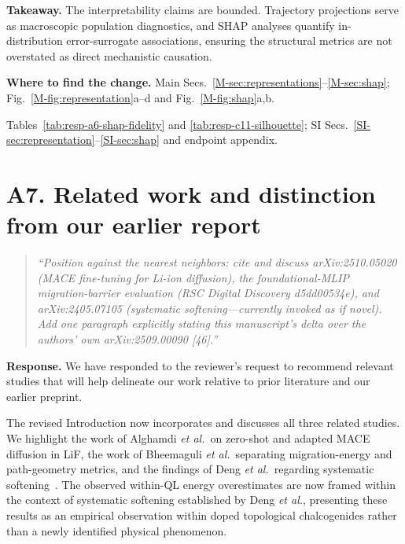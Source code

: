 \documentclass[11pt]{article}
\newcommand{\location}[2]{\par{\small\textbf{Where to find the change.} #1\par #2}\par}
\begin{document}
\textbf{Takeaway.} The interpretability claims are bounded. Trajectory projections serve as macroscopic population diagnostics, and SHAP analyses quantify in-distribution error-surrogate associations, ensuring the structural metrics are not overstated as direct mechanistic causation.
\location{Main Secs.~\ref{M-sec:representations}--\ref{M-sec:shap}; Fig.~\ref{M-fig:representation}a--d and Fig.~\ref{M-fig:shap}a,b.}{Tables~\ref{tab:resp-a6-shap-fidelity} and \ref{tab:resp-c11-silhouette}; SI Secs.~\ref{SI-sec:representation}--\ref{SI-sec:shap} and endpoint appendix.}

\section*{A7. Related work and distinction from our earlier report}

\begin{quote}\small \itshape
``Position against the nearest neighbors: cite and discuss arXiv:2510.05020 (MACE fine-tuning for Li-ion diffusion), the foundational-MLIP migration-barrier evaluation (RSC Digital Discovery d5dd00534e), and arXiv:2405.07105 (systematic softening---currently invoked as if novel). Add one paragraph explicitly stating this manuscript's delta over the authors' own arXiv:2509.00090 [46].''\end{quote}

\textbf{Response.} 
We have responded to the reviewer's request to recommend  relevant studies that will help delineate our work relative to prior literature and our earlier preprint.

The revised Introduction now incorporates and discusses all three related studies. We highlight the work of Alghamdi \textit{et al.}\ on zero-shot and adapted MACE diffusion in LiF, the work of Bheemaguli \textit{et al.}\ separating migration-energy and path-geometry metrics, and the findings of Deng \textit{et al.}\ regarding systematic softening~\citep{alghamdi2025maceLiF,bheemaguli2026mlipBarriers,deng2025softening}. The observed within-QL energy overestimates are now framed within the context of systematic softening established by Deng \textit{et al.}, presenting these results as an empirical observation within doped topological chalcogenides rather than a newly identified physical phenomenon.
\end{document}
